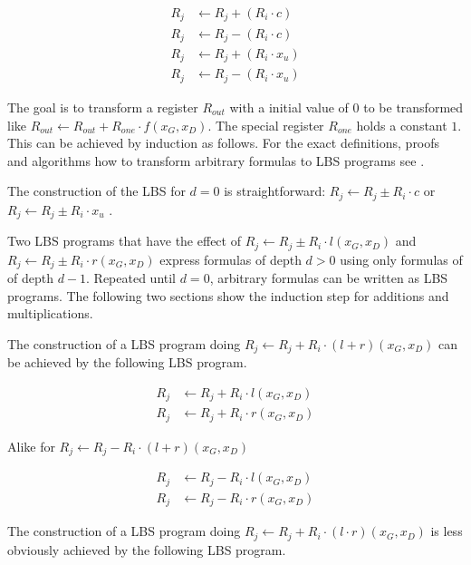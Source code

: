 \begin{align*}
R_j & \leftarrow R_j + (R_i \cdot c) \\
R_j & \leftarrow R_j - (R_i \cdot c) \\
R_j & \leftarrow R_j + (R_i \cdot x_u) \\
R_j & \leftarrow R_j - (R_i \cdot x_u)
\end{align*}



The goal is to transform a register $R_{out}$ with a initial value of $0$ to be
transformed like $R_{out} \leftarrow R_{out} + R_{one} \cdot f(x_G,x_D)$. The
special register $R_{one}$ holds a constant $1$. This can be achieved by
induction as follows.  For the exact definitions, proofs and algorithms how to
transform arbitrary formulas to LBS programs see \cite{cleve91}.



The construction of the LBS for $d = 0$ is straightforward:
$R_j \leftarrow R_j \pm R_i \cdot c$ or $R_j \leftarrow R_j \pm R_i \cdot x_u$ .



Two LBS programs that have the effect of $R_j \leftarrow R_j \pm R_i \cdot
l(x_G, x_D)$  and $R_j \leftarrow R_j \pm R_i \cdot r(x_G, x_D)$ express
formulas of depth $d > 0$ using only formulas of of depth $d - 1$. Repeated
until $d = 0$, arbitrary formulas can be written as LBS programs. The following
two sections show the induction step for additions and multiplications.

 The construction of a LBS program doing $R_j \leftarrow R_j
+ R_i \cdot (l + r)(x_G, x_D)$ can be achieved by the following LBS program.

\begin{align*}
R_j & \leftarrow R_j + R_i \cdot l(x_G, x_D) \\
R_j & \leftarrow R_j + R_i \cdot r(x_G, x_D)
\end{align*}

Alike for $R_j \leftarrow R_j - R_i \cdot (l + r)(x_G, x_D)$

\begin{align*}
R_j & \leftarrow R_j - R_i \cdot l(x_G, x_D) \\
R_j & \leftarrow R_j - R_i \cdot r(x_G, x_D)
\end{align*}


 The construction of a LBS program doing $R_j \leftarrow
R_j + R_i \cdot (l \cdot r)(x_G, x_D)$ is less obviously achieved by the
following LBS program.

